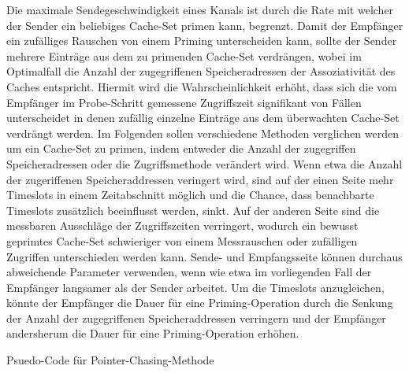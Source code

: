Die maximale Sendegeschwindigkeit eines Kanals ist durch die Rate mit welcher der Sender ein beliebiges Cache-Set primen kann, begrenzt.
Damit der Empfänger ein zufälliges Rauschen von einem Priming unterscheiden kann, sollte der Sender mehrere Einträge aus dem zu primenden Cache-Set verdrängen, wobei im Optimalfall die Anzahl der zugegriffenen Speicheradressen der Assoziativität des Caches entspricht.
Hiermit wird die Wahrscheinlichkeit erhöht, dass sich die vom Empfänger im Probe-Schritt gemessene Zugriffszeit signifikant von Fällen unterscheidet in denen zufällig einzelne Einträge aus dem überwachten Cache-Set verdrängt werden. 
Im Folgenden sollen verschiedene Methoden verglichen werden um ein Cache-Set zu primen, indem entweder die Anzahl der zugegriffen Speicheradressen oder die Zugriffsmethode verändert wird.
Wenn etwa die Anzahl der zugeriffenen Speicheraddressen veringert wird, sind auf der einen Seite mehr Timeslots in einem Zeitabschnitt möglich und die Chance, dass benachbarte Timeslots zusätzlich beeinflusst werden, sinkt. Auf der anderen Seite sind die messbaren Ausschläge der Zugriffszeiten verringert, wodurch ein bewusst geprimtes Cache-Set schwieriger von einem Messrauschen oder zufälligen Zugriffen unterschieden werden kann.
Sende- und Empfangsseite können durchaus abweichende Parameter verwenden, wenn wie etwa im vorliegenden Fall der Empfänger langsamer als der Sender arbeitet. Um die Timeslots anzugleichen, könnte der Empfänger die Dauer für eine Priming-Operation durch die Senkung der Anzahl der zugegriffenen Speicheraddressen verringern und der Empfänger andersherum die Dauer für eine Priming-Operation erhöhen. 

\begin{algorithm}[h]
\DontPrintSemicolon
\caption{Psuedo-Code für Pointer-Chasing-Methode}
\label{alg:pointerChasing}


\end{algorithm}

